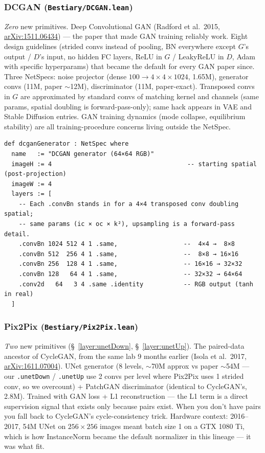 \subsubsection*{DCGAN (\texttt{Bestiary/DCGAN.lean})}
\emph{Zero} new primitives. Deep Convolutional GAN (Radford et
al.\ 2015, \href{https://arxiv.org/abs/1511.06434}{arXiv:1511.06434}) --- the paper that made GAN training reliably work. Eight
design guidelines (strided convs instead of pooling, BN everywhere
except $G$'s output / $D$'s input, no hidden FC layers, ReLU in $G$
/ LeakyReLU in $D$, Adam with specific hyperparams) that became the
default for every GAN paper since. Three NetSpecs: noise projector
(dense $100 \to 4 \times 4 \times 1024$, 1.65M), generator convs
(11M, paper $\sim$12M), discriminator (11M, paper-exact). Transposed
convs in $G$ are approximated by standard convs of matching kernel
and channels (same params, spatial doubling is forward-pass-only);
same hack appears in VAE and Stable Diffusion entries. GAN training
dynamics (mode collapse, equilibrium stability) are all
training-procedure concerns living outside the NetSpec.

\begin{verbatim}
def dcganGenerator : NetSpec where
  name   := "DCGAN generator (64×64 RGB)"
  imageH := 4                                     -- starting spatial (post-projection)
  imageW := 4
  layers := [
    -- Each .convBn stands in for a 4×4 transposed conv doubling spatial;
    -- same params (ic × oc × k²), upsampling is a forward-pass detail.
    .convBn 1024 512 4 1 .same,                  --  4×4 →  8×8
    .convBn 512  256 4 1 .same,                  --  8×8 → 16×16
    .convBn 256  128 4 1 .same,                  -- 16×16 → 32×32
    .convBn 128   64 4 1 .same,                  -- 32×32 → 64×64
    .conv2d   64   3 4 .same .identity           -- RGB output (tanh in real)
  ]
\end{verbatim}

\subsubsection*{Pix2Pix (\texttt{Bestiary/Pix2Pix.lean})}
\emph{Two} new primitives (\S~\ref{layer:unetDown}, \S~\ref{layer:unetUp}). The paired-data ancestor of CycleGAN,
from the same lab 9 months earlier (Isola et al.\ 2017,
\href{https://arxiv.org/abs/1611.07004}{arXiv:1611.07004}). UNet
generator (8 levels, $\sim$70M approx vs paper $\sim$54M --- our
\texttt{.unetDown} / \texttt{.unetUp} use 2 convs per level where
Pix2Pix uses 1 strided conv, so we overcount) + PatchGAN
discriminator (identical to CycleGAN's, 2.8M). Trained with GAN
loss + L1 reconstruction --- the L1 term is a direct supervision
signal that exists only because pairs exist. When you don't have
pairs you fall back to CycleGAN's cycle-consistency trick. Hardware
context: 2016--2017, 54M UNet on $256 \times 256$ images meant
batch size 1 on a GTX 1080 Ti, which is how InstanceNorm became the
default normalizer in this lineage --- it was what fit.

